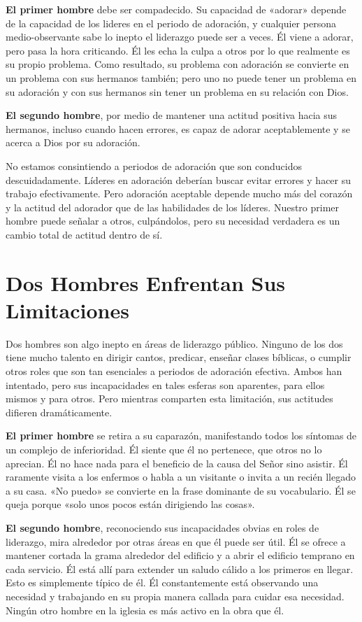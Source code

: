 \documentclass[12pt, twoside, openright]{book}
\begin{document}
\textbf{El primer hombre} debe ser compadecido. Su capacidad de «adorar» depende de la capacidad de los lideres en el periodo de adoración, y cualquier persona medio-observante sabe lo inepto el liderazgo puede ser a veces. Él viene a adorar, pero pasa la hora criticando. Él les echa la culpa a otros por lo que realmente es su propio problema. Como resultado, su problema con adoración se convierte en un problema con sus hermanos también; pero uno no puede tener un problema en su adoración y con sus hermanos sin tener un problema en su relación con Dios. 

\textbf{El segundo hombre}, por medio de mantener una actitud positiva hacia sus hermanos, incluso cuando hacen errores, es capaz de adorar aceptablemente y se acerca a Dios por su adoración. 

No estamos consintiendo a periodos de adoración que son conducidos descuidadamente. Líderes en adoración deberían buscar evitar errores y hacer su trabajo efectivamente. Pero adoración aceptable depende mucho más del corazón y la actitud del adorador que de las habilidades de los líderes. Nuestro primer hombre puede señalar a otros, culpándolos, pero su necesidad verdadera es un cambio total de actitud dentro de sí. 

\section{Dos Hombres Enfrentan Sus Limitaciones}
Dos hombres son algo inepto en áreas de liderazgo público. Ninguno de los dos tiene mucho talento en dirigir cantos, predicar, enseñar clases bíblicas, o cumplir otros roles que son tan esenciales a periodos de adoración efectiva. Ambos han intentado, pero sus incapacidades en tales esferas son aparentes, para ellos mismos y para otros. Pero mientras comparten esta limitación, sus actitudes difieren dramáticamente. 

\textbf{El primer hombre} se retira a su caparazón, manifestando todos los síntomas de un complejo de inferioridad. Él siente que él no pertenece, que otros no lo aprecian. Él no hace nada para el beneficio de la causa del Señor sino asistir. Él raramente visita a los enfermos o habla a un visitante o invita a un recién llegado a su casa. «No puedo» se convierte en la frase dominante de su vocabulario. Él se queja porque «solo unos pocos están dirigiendo las cosas».

\textbf{El segundo hombre}, reconociendo sus incapacidades obvias en roles de liderazgo, mira alrededor por otras áreas en que él puede ser útil. Él se ofrece a mantener cortada la grama alrededor del edificio y a abrir el edificio temprano en cada servicio. Él está allí para extender un saludo cálido a los primeros en llegar. Esto es simplemente típico de él. Él constantemente está observando una necesidad y trabajando en su propia manera callada para cuidar esa necesidad. Ningún otro hombre en la iglesia es más activo en la obra que él. 
\end{document}

